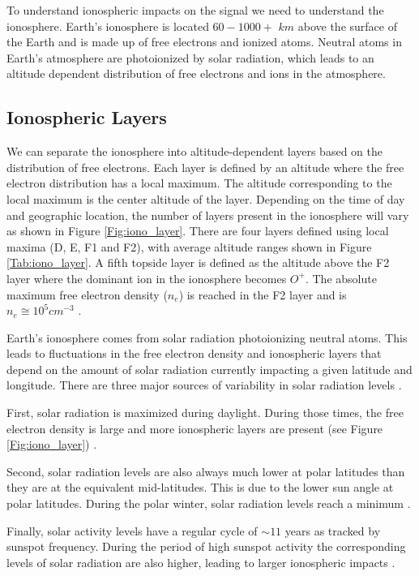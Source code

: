 To understand ionospheric impacts on the \cm signal we need to understand the ionosphere. Earth's ionosphere is located $60 - 1000+$ $km$ above the surface of the Earth and is made up of free electrons and ionized atoms. Neutral atoms in Earth's atmosphere are photoionized by solar radiation, which leads to an altitude dependent distribution of free electrons and ions in the atmosphere.


\subsection{Ionospheric Layers}

We can separate the ionosphere into altitude-dependent layers based on the distribution of free electrons. Each layer is defined by an altitude where the free electron distribution has a local maximum. The altitude corresponding to the local maximum is the center altitude of the layer. Depending on the time of day and geographic location, the number of layers present in the ionosphere will vary as shown in Figure \ref{Fig:iono_layer}. There are four layers defined using local maxima (D, E, F1 and F2), with average altitude ranges shown in Figure \ref{Tab:iono_layer}. A fifth topside layer is defined as the altitude above the F2 layer where the dominant ion in the ionosphere becomes $O^+$. The absolute maximum free electron density ($n_e$) is reached in the F2 layer and is $n_e \cong 10^5 cm^{-3}$ \cite{ionospheres}. 

Earth's ionosphere comes from solar radiation photoionizing neutral atoms. This leads to fluctuations in the free electron density and ionospheric layers that depend on the amount of solar radiation currently impacting a given latitude and longitude. There are three major sources of variability in solar radiation levels \cite{ionospheres}.

First, solar radiation is maximized during daylight. During those times, the free electron density is large and more ionospheric layers are present (see Figure \ref{Fig:iono_layer}) \cite{ionospheres}. 

Second, solar radiation levels are also always much lower at polar latitudes than they are at the equivalent mid-latitudes. This is due to the lower sun angle at polar latitudes. During the polar winter, solar radiation levels reach a minimum \cite{ionospheres}. 

Finally, solar activity levels have a regular cycle of $\sim 11$ years as tracked by sunspot frequency. During the period of high sunspot activity the corresponding levels of solar radiation are also higher, leading to larger ionospheric impacts \cite{ionospheres}. 


